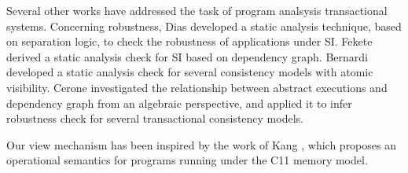 Several other works have addressed the task of program analsysis transactional systems. 
Concerning robustness, 
Dias \etal \cite{dias-tm} developed a static analysis technique, based on separation logic, 
to check the robustness of applications under SI. Fekete \etal \cite{fekete-tods} derived 
a static analysis check for SI based on dependency graph. Bernardi \etal \cite{giovanni-concur16} 
developed a static analysis check for several consistency models with atomic visibility. 
Cerone \etal \cite{laws} investigated the relationship between abstract 
executions and dependency graph from an algebraic perspective, and applied it to infer 
robustness check for several transactional consistency models. 

Our view mechanism has been inspired by the work of Kang \etal \cite{promises}, 
which proposes an operational semantics for programs running under the C11 memory model.